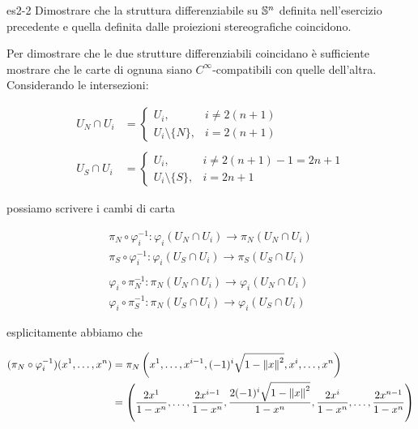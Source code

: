
{es2-2}
{
Dimostrare che la struttura differenziabile su $ \S^{n} $ definita nell’esercizio precedente e quella definita dalle proiezioni stereografiche coincidono.
}
{
Per dimostrare che le due strutture differenziabili coincidano è sufficiente mostrare che le carte di ognuna siano $ C^{\infty} $-compatibili con quelle dell'altra. \\
Considerando le intersezioni:

\begin{align}
	U_{N} \cap U_{i} &= %
	\begin{cases}
		U_{i}, & i \neq 2(n+1) \\
		U_{i} \setminus \{ N \}, & i = 2(n+1)
	\end{cases} \\
	\nonumber \\
	U_{S} \cap U_{i} &= %
	\begin{cases}
		U_{i}, & i \neq 2(n+1) - 1 = 2 n + 1 \\
		U_{i} \setminus \{ S \}, & i = 2n+1
	\end{cases}
\end{align}

possiamo scrivere i cambi di carta

\begin{gather}
	\pi_{N} \circ \varphi_{i}^{-1} : \varphi_{i}(U_{N} \cap U_{i}) \to \pi_{N}(U_{N} \cap U_{i}) \\
	\pi_{S} \circ \varphi_{i}^{-1} : \varphi_{i}(U_{S} \cap U_{i}) \to \pi_{S}(U_{S} \cap U_{i}) \\
	\nonumber \\
	\varphi_{i} \circ \pi_{N}^{-1} : \pi_{N}(U_{N} \cap U_{i}) \to \varphi_{i}(U_{N} \cap U_{i}) \\
	\varphi_{i} \circ \pi_{S}^{-1} : \pi_{N}(U_{S} \cap U_{i}) \to \varphi_{i}(U_{S} \cap U_{i})
\end{gather}

esplicitamente abbiamo che

\begin{align}
	\begin{split}
		(\pi_{N} \circ \varphi_{i}^{-1})(x^{1},\dots,x^{n}) &= \pi_{N} \left( x^{1}, \dots, x^{i-1}, (-1)^{i} \sqrt{1 - \norm{x}^{2}}, x^{i}, \dots, x^{n} \right) \\
		&= \left( \dfrac{2 x^{1}}{1-x^{n}}, \dots, \dfrac{2 x^{i-1}}{1-x^{n}}, \dfrac{2 (-1)^{i} \sqrt{1 - \norm{x}^{2}}}{1-x^{n}}, \dfrac{2 x^{i}}{1-x^{n}}, \dots, \dfrac{2 x^{n-1}}{1-x^{n}} \right)
	\end{split}
\end{align}

}
